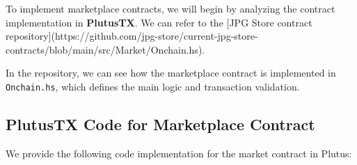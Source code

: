 To implement marketplace contracts, we will begin by analyzing the contract implementation in \textbf{PlutusTX}. We can refer to the [JPG Store contract repository](https://github.com/jpg-store/current-jpg-store-contracts/blob/main/src/Market/Onchain.hs).

In the repository, we can see how the marketplace contract is implemented in \texttt{Onchain.hs}, which defines the main logic and transaction validation.

\subsection{PlutusTX Code for Marketplace Contract}

We provide the following code implementation for the market contract in Plutus:

